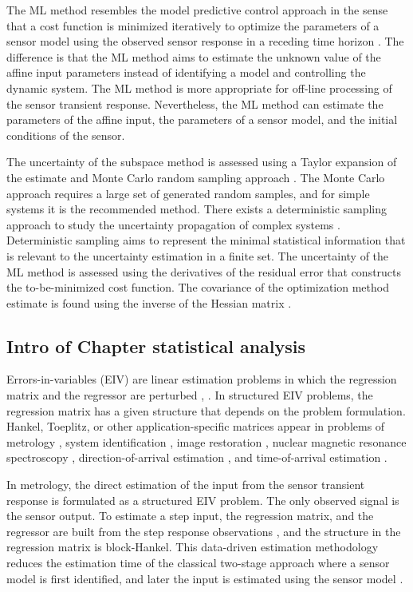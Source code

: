 The ML method resembles the model predictive control approach in the sense that a cost function is minimized iteratively to optimize the parameters of a sensor model using the observed sensor response in a receding time horizon \cite{Mayne14}.
The difference is that the ML method aims to estimate the unknown value of the affine input parameters instead of identifying a model and controlling the dynamic system.
The ML method is more appropriate for off-line processing of the sensor transient response.
Nevertheless, the ML method can estimate the parameters of the affine input, the parameters of a sensor model, and the initial conditions of the sensor.

The uncertainty of the subspace method is assessed using a Taylor expansion of the estimate and Monte Carlo random sampling approach \cite{Quintana19}.
The Monte Carlo approach requires a large set of generated random samples, and for simple systems it is the recommended method.
There exists a deterministic sampling approach to study the uncertainty propagation of complex systems \cite{Hessling13a, Hessling13b}. 
Deterministic sampling aims to represent the minimal statistical information that is relevant to the uncertainty estimation in a finite set.
The uncertainty of the ML method is assessed using the derivatives of the residual error that constructs the to-be-minimized cost function.
The covariance of the optimization method estimate is found using the inverse of the Hessian matrix \cite{Pintelon12Book}.


\subsection{Intro of Chapter statistical analysis}

Errors-in-variables (EIV) are linear estimation problems in which the regression matrix and the regressor are perturbed \cite{VanHuffel91Book}, \cite{Markovsky07overview}.
In structured EIV problems, the regression matrix has a given structure that depends on the problem formulation.
Hankel, Toeplitz, or other application-specific matrices appear in problems of metrology \cite{Markovsky15cep}, system identification \cite{Soderstrom07}, image restoration \cite{Feiz17}, nuclear magnetic resonance spectroscopy \cite{Cai16}, direction-of-arrival estimation \cite{Pan18}, and time-of-arrival estimation \cite{Jia18}.

In metrology, the direct estimation of the input from the sensor transient response is formulated as a structured EIV problem.
The only observed signal is the sensor output.
To estimate a step input, the regression matrix, and the regressor are built from the step response observations \cite{Markovsky15cep}, and
the structure in the regression matrix is block-Hankel.
This data-driven estimation methodology reduces the estimation time of the classical two-stage approach where a sensor model is first identified, and later the input is estimated using the sensor model \cite{Azam15, Niedzwiecki16a}.


